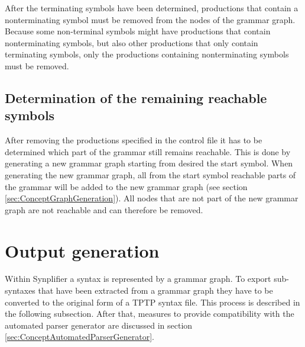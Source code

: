 After the terminating symbols have been determined, productions that contain a nonterminating symbol must be removed from the nodes of the grammar graph. Because some non-terminal symbols might have productions that contain nonterminating symbols, but also other productions that only contain terminating symbols, only the productions containing nonterminating symbols must be removed.

%

\subsection{Determination of the remaining reachable symbols}\label{sec:ConceptDerterminingRemainingReachable}

After removing the productions specified in the control file it has to be determined which part of the grammar still remains reachable.
This is done by generating a new grammar graph starting from desired the start symbol.
When generating the new grammar graph, all from the start symbol reachable parts of the grammar will be added to the new grammar graph (see section \ref{sec:ConceptGraphGeneration}).
All nodes that are not part of the new grammar graph are not reachable and can therefore be removed.

\section{Output generation}\label{sec:ConceptOutputGeneration}

Within \ac{Synplifier} a syntax is represented by a grammar graph.
To export sub-syntaxes that have been extracted from a grammar graph they have to be converted to the original form of a \ac{TPTP} syntax file. This process is described in the following subsection.
After that, measures to provide compatibility with the automated parser generator are discussed in section \ref{sec:ConceptAutomatedParserGenerator}.

